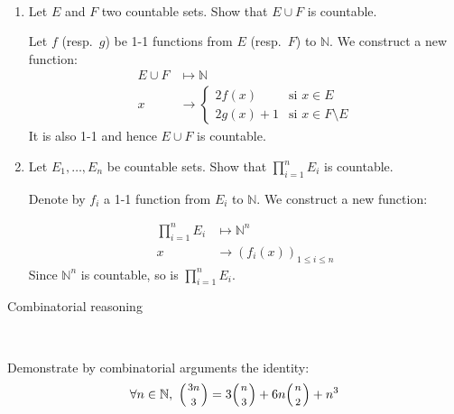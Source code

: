 \documentclass[a4paper,11pt]{exam}
\renewcommand{\binom}{\mbinom}
\newcommand{\N}{\mathbb{N}}
\begin{document}
\begin{questions}

  \setcounter{question}{-1}
  \question %
  ~\vspace{-0.5cm}
  \begin{enumerate}
    \item Let $E$ and $F$ two countable sets. 
      Show that $E \cup F$ is countable.

      \begin{solution}
      	Let $f$ (resp.\ $g$) be 1-1 functions from $E$ (resp.\ $F$) to $\N$. We construct a new function:
      	\[
      	\begin{array}{rl}
      	E \cup F & \mapsto \N \\
      	x & \rightarrow \left\{
      	\begin{array}{ll}
      	2f(x) & \text{si } x \in E \\
      	2g(x)+1 & \text{si } x \in F \setminus E
      	\end{array}
      	\right.
      	\end{array}
      	\]
      	It is also 1-1 and hence $E \cup F$ is countable.
      \end{solution}

    \item Let $E_1, \dots, E_n$ be countable sets. 
      Show that $\prod_{i=1}^n E_i$ is countable.

      \begin{solution}
      	Denote by $f_i$ a 1-1 function from $E_i$ to $\N$. We construct a new function:
       
        \[
          \begin{array}{rl}
          \prod_{i=1}^n E_i & \mapsto \N^n \\
          x & \rightarrow (f_i(x))_{1 \leq i \leq n}
          \end{array}
        \]
        Since $\N^n$ is countable, so is $\prod_{i=1}^n E_i$.
      \end{solution}
  \end{enumerate}

  \vspace{0.6cm}
  \colorbox{gris}{
    \begin{minipage}[c]{\textwidth}
      Combinatorial reasoning
    \end{minipage}
  }~
  \vspace{-0.1cm}

  \question
  Demonstrate by combinatorial arguments the identity:
  \[
    \forall n\in\N,~\binom{3n}{3} = 3\binom{n}{3} + 6n\binom{n}{2} + n^3
  \]


\end{questions}
\end{document}
